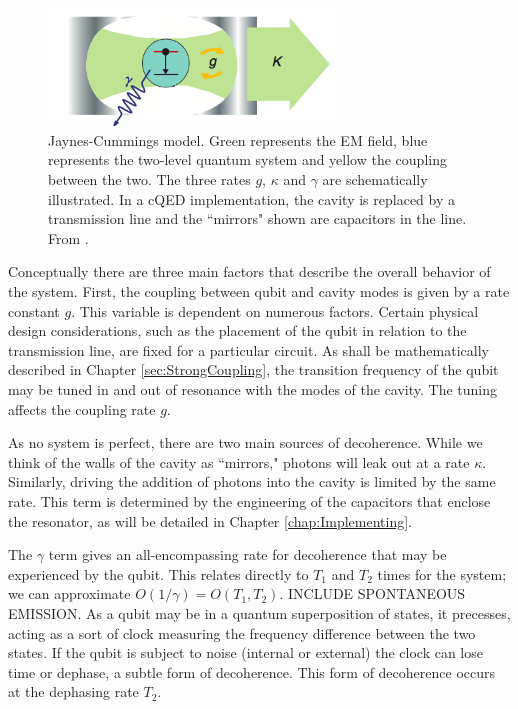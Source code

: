 \documentclass[12 pt]{book}
\begin{document}
\begin{figure}[h] 
   \centering
   \includegraphics[width=3in]{Semba-Toy-cQED.png} 
   \caption{Jaynes-Cummings model. Green represents the EM field, blue represents the two-level quantum system and yellow the coupling between the two. The three rates $g$, $\kappa$ and $\gamma$ are schematically illustrated. In a cQED implementation, the cavity is replaced by a transmission line and the ``mirrors" shown are capacitors in the line. From \cite{Semba}.}
   \label{fig:ToycQED}
\end{figure}

Conceptually there are three main factors that describe the overall behavior of the system. First, the coupling between qubit and cavity modes is given by a rate constant $g$. This variable is dependent on numerous factors. Certain physical design considerations, such as the placement of the qubit in relation to the transmission line, are fixed for a particular circuit. As shall be mathematically described in Chapter \ref{sec:StrongCoupling}, the transition frequency of the qubit may be tuned in and out of resonance with the modes of the cavity. The tuning affects the coupling rate $g$. 

As no system is perfect, there are two main sources of decoherence. While we think of the walls of the cavity as ``mirrors," photons will leak out at a rate $\kappa$. Similarly, driving the addition of photons into the cavity is limited by the same rate. This term is determined by the engineering of the capacitors that enclose the resonator, as will be detailed in Chapter \ref{chap:Implementing}. 

The $\gamma$ term gives an all-encompassing rate for decoherence that may be experienced by the qubit. This relates directly to $T_1$ and $T_2$ times for the system; we can approximate $O(1/\gamma)= O(T_1,T_2)$. INCLUDE SPONTANEOUS EMISSION. As a qubit may be in a quantum superposition of states, it precesses, acting as a sort of clock measuring the frequency difference between the two states. If the qubit is subject to noise (internal or external) the clock can lose time or dephase, a subtle form of decoherence.\cite{Schuster} This form of decoherence occurs at the dephasing rate $T_2$.
\end{document}
